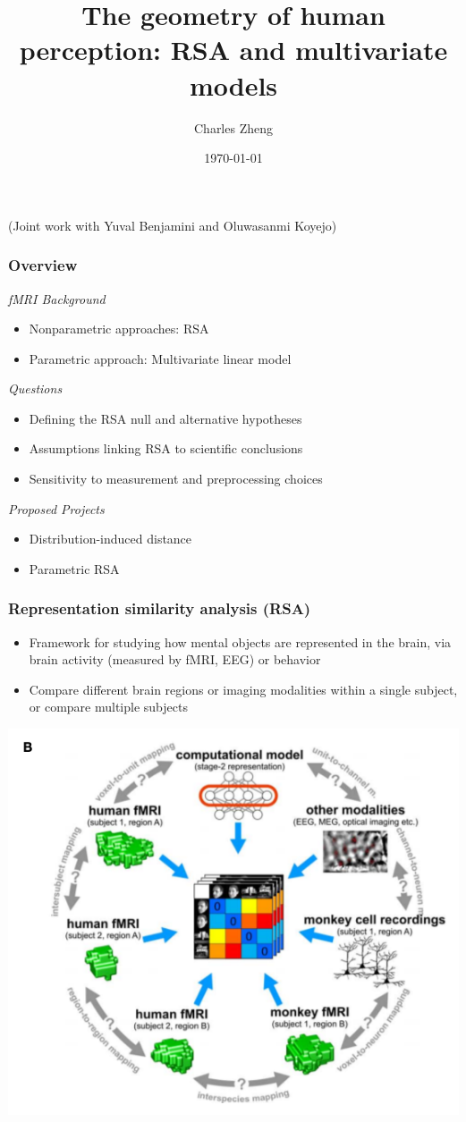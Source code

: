 \documentclass{beamer}
\title[Informal]{The geometry of human perception: RSA and multivariate models}
\author{Charles Zheng} %
\institute[Stanford] %
{Stanford University}
\date{\today} %
\begin{document}
\begin{frame}
\titlepage %
(Joint work with Yuval Benjamini and Oluwasanmi Koyejo)
\end{frame}

\begin{frame}
\frametitle{Overview}
\noindent\emph{fMRI Background}
\begin{itemize}
\item Nonparametric approaches: RSA
\item Parametric approach: Multivariate linear model
\end{itemize}
\noindent\emph{Questions}
\begin{itemize}
\item Defining the RSA null and alternative hypotheses
\item Assumptions linking RSA to scientific conclusions
\item Sensitivity to measurement and preprocessing choices
\end{itemize}
\noindent\emph{Proposed Projects}
\begin{itemize}
\item Distribution-induced distance
\item Parametric RSA
\end{itemize}
\end{frame}

\begin{frame}
\frametitle{Representation similarity analysis (RSA)}
\begin{itemize}
\item Framework for studying how mental objects are represented in the brain,
via brain activity (measured by fMRI, EEG) or behavior
\item Compare different brain regions or imaging modalities within a single subject, or compare multiple subjects
\end{itemize}
\begin{center}
\includegraphics[scale = 0.3]{k08_b.png}
\end{center}
\end{frame}
\end{document}
